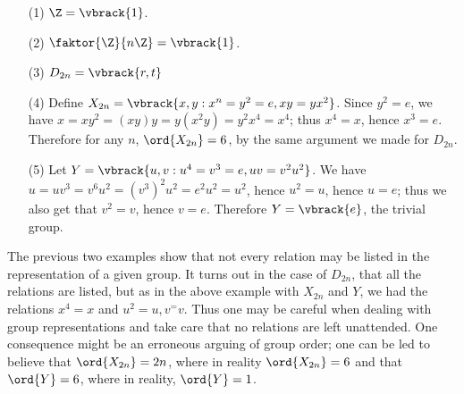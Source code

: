 \begin{example}
    \begin{enumerate}
        \item[(1)] $\Z=\vbrack{1}$.

        \item[(2)] $\faktor{\Z}{n\Z}=\vbrack{1}$.

        \item[(3)] $D_{2n}=\vbrack{r,t}$

        \item[(4)] Define $X_{2n}=\vbrack{x,y : x^n=y^2=e, xy=yx^2}$. Since
            $y^2=e$, we have  $x=xy^2=(xy)y=y(x^2y)=y^2x^4=x^4$; thus $x^4=x$,
            hence  $x^3=e$. Therefore  for any $n$,  $\ord{X_{2n}}=6$, by the
            same argument we made for $D_{2n}$.

        \item[(5)] Let $Y=\vbrack{u,v : u^4=v^3=e, uv=v^2u^2}$. We have
            $u=uv^3=v^6u^2=(v^3)^2u^2=e^2u^2=u^2$, hence $u^2=u$, hence  $u=e$;
            thus we also get that  $v^2=v$, hence  $v=e$. Therefore
            $Y=\vbrack{e}$, the trivial group.
    \end{enumerate}
\end{example}

The previous two examples show that not every relation may be listed in the
representation of a given group. It turns out in the case of $D_{2n}$, that all
the relations are listed, but as in the above example with $X_{2n}$ and $Y$, we
had the relations $x^4=x$ and  $u^2=u, v^=v$. Thus one may be careful when
dealing with group representations and take care that no relations are left
unattended. One consequence might be an erroneous arguing of group order; one
can be led to believe that $\ord{X_{2n}}=2n$, where in reality $\ord{X_{2n}}=6$
and that $\ord{Y}=6$, where in reality, $\ord{Y}=1$.
